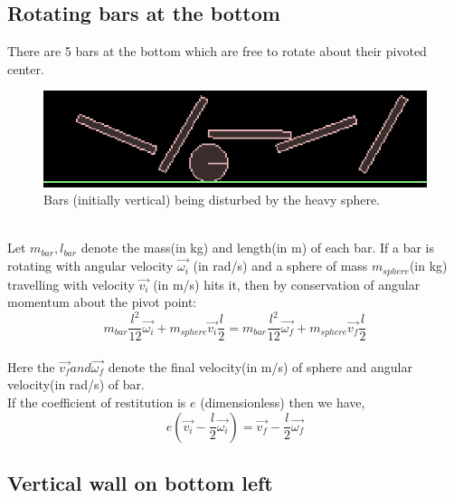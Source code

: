 \documentclass[11pt,english]{article}
\begin{document}
\subsection{Rotating bars at the bottom}
\indent \par{There are 5 bars at the bottom which are free to rotate about their pivoted center.}
\begin{figure}[h!]
\centering
\includegraphics[scale=1.3]{bottombars}
\caption{Bars (initially vertical) being disturbed by the heavy sphere.}
\end{figure}
\\
\indent Let $m_{bar}, l_{bar}$ denote the mass(in kg) and length(in m) of each bar. If a bar is rotating with angular velocity $\vec{\omega_{i}}$ (in rad/s) and a sphere of mass $m_{sphere}$(in kg) travelling with velocity $\vec{v_{i}}$ (in m/s) hits it, then by conservation of angular momentum\cite{wikicoam} about the pivot point: 
\begin{equation}
m_{bar} \frac{l^2}{12} \vec{\omega_{i}} + m_{sphere} \vec{v_{i}} \frac{l}{2} = m_{bar}\frac{l^2}{12}\vec{\omega_{f}} + m_{sphere}\vec{v_{f}}\frac{l}{2}
\end{equation}
\\ \indent Here the $\vec{v_{f}} and \vec{\omega_{f}}$ denote the final velocity(in m/s) of sphere and angular velocity(in rad/s) of bar.
\\ If the coefficient of restitution\cite{wikirest} is $e$ (dimensionless) then we have, 
\begin{equation}
e(\vec{v_{i}}-\frac{l}{2}\vec{\omega_{i}}) =  \vec{v_{f}} - \frac{l}{2} \vec{\omega_{f}}
\end{equation}

\subsection{Vertical wall on bottom left}
\end{document}
